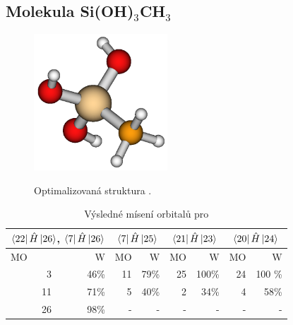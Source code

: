 \documentclass[
  digital, %
  table,   %
  lof,     %
  lot,     %
]{fithesis3}
\begin{document}
\subsection{Molekula Si(OH)$_3$CH$_3$}
\begin{figure}[h!]
\caption{Optimalizovaná struktura . }
  \center
  \includegraphics[width=5cm]{si(oh)3ch3_obr.png}
  \label{obr_sioh3ch3_opt_struktura}
  \end{figure}
  
\begin{table}[htbp]
\caption{Výsledné mísení orbitalů pro }
\begin{center}
\begin{tabular}{|r|r|r|r|r|r|r|r|}
\hline
\multicolumn{2}{|c|}{$\bra{22}{\hat{H}}\ket{26}$, $\bra{7}{\hat{H}}\ket{26}$} & \multicolumn{2}{|c|}{$\bra{7}{\hat{H}}\ket{25}$}& \multicolumn{2}{|c|}{$\bra{21}{\hat{H}}\ket{23}$} &\multicolumn{2}{|c|}{$\bra{20}{\hat{H}}\ket{24}$} \\
\hline
\hline
\multicolumn{1}{|l|}{MO} & \multicolumn{1}{r|}{W} & \multicolumn{1}{l|}{MO} & \multicolumn{1}{r|}{W} & MO & \multicolumn{1}{r|}{W}& MO & \multicolumn{1}{r|}{W} \\ \hline
3 & 46\% & 11 & 79\% &25 & 100\%& 24 & 100 \% \\ \hline
11 & 71\% & 5 & 40\% & 2 & 34\% &4 & 58\% \\ \hline
26 & 98\% & - & - &  -& - &-&- \\ \hline
\end{tabular}
\end{center}
\label{tab_sioh3ch3_vysledky}
\end{table}
\end{document}
